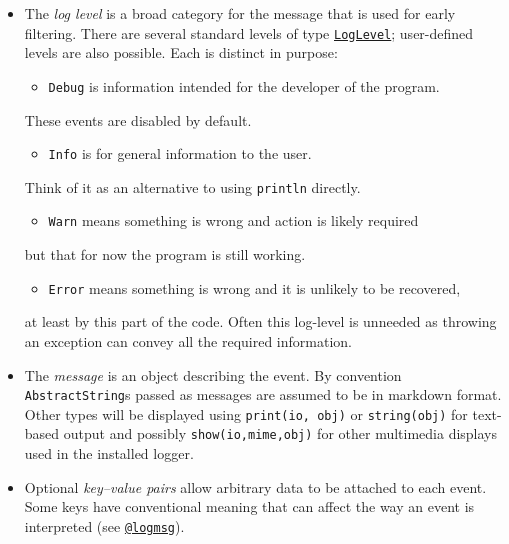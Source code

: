 \begin{itemize}
\item The \emph{log level} is a broad category for the message that is used for early filtering. There are several standard levels of type \hyperlink{10879938884267981707}{\texttt{LogLevel}}; user-defined levels are also possible. Each is distinct in purpose:

\begin{itemize}
\item \texttt{Debug} is information intended for the developer of the program.

\end{itemize}
These events are disabled by default.

\begin{itemize}
\item \texttt{Info} is for general information to the user.

\end{itemize}
Think of it as an alternative to using \texttt{println} directly.

\begin{itemize}
\item \texttt{Warn} means something is wrong and action is likely required

\end{itemize}
but that for now the program is still working.

\begin{itemize}
\item \texttt{Error} means something is wrong and it is unlikely to be recovered,

\end{itemize}
at least by this part of the code. Often this log-level is unneeded as throwing an exception can convey all the required information.


\item The \emph{message}  is an object describing the event. By convention \texttt{AbstractString}s passed as messages are assumed to be in markdown format. Other types will be displayed using \texttt{print(io, obj)} or \texttt{string(obj)} for text-based output and possibly \texttt{show(io,mime,obj)} for other multimedia displays used in the installed logger.


\item Optional \emph{key–value pairs} allow arbitrary data to be attached to each event. Some keys have conventional meaning that can affect the way an event is interpreted (see \hyperlink{2787319849348710857}{\texttt{@logmsg}}).

\end{itemize}


